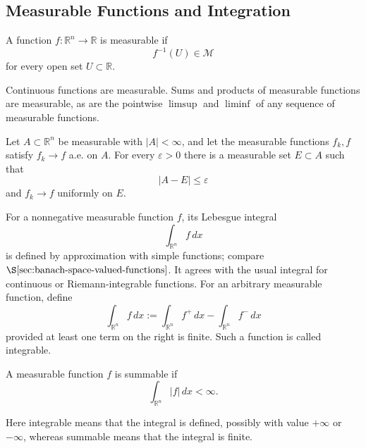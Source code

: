 \subsection{Measurable Functions and Integration}
\label{sec:measurable-functions-integration}

\begin{definition}
\label{def:measurable-function}

A function $f:\mathbb R^n\to\mathbb R$ is measurable if
\[
f^{-1}(U)\in\mathcal M
\]
for every open set $U\subset\mathbb R$.
\end{definition}

Continuous functions are measurable. Sums and products of measurable functions
are measurable, as are the pointwise $\limsup$ and $\liminf$ of any sequence of
measurable functions.

\begin{theorem}
\label{thm:egoroffs-theorem}

Let $A\subset\mathbb R^n$ be measurable with $|A|<\infty$, and let the
measurable functions $f_k,f$ satisfy $f_k\to f$ a.e. on $A$. For every
$\varepsilon>0$ there is a measurable set $E\subset A$ such that
\[
|A-E|\leq\varepsilon
\]
and $f_k\to f$ uniformly on $E$.
\end{theorem}

For a nonnegative measurable function $f$, its Lebesgue integral
\[
\int_{\mathbb R^n}f\,dx
\]
is defined by approximation with simple functions; compare
$\S\ref{sec:banach-space-valued-functions}$. It agrees with the usual integral
for continuous or Riemann-integrable functions. For an arbitrary measurable
function, define
\[
\int_{\mathbb R^n}f\,dx
:=\int_{\mathbb R^n}f^+\,dx-\int_{\mathbb R^n}f^-\,dx
\]
provided at least one term on the right is finite. Such a function is called
integrable.

\begin{definition}
\label{def:summable-function}

A measurable function $f$ is summable if
\[
\int_{\mathbb R^n}|f|\,dx<\infty.
\]
\end{definition}

\begin{remark}
\label{rem:integrable-vs-summable-terminology}

Here integrable means that the integral is defined, possibly with value
$+\infty$ or $-\infty$, whereas summable means that the integral is finite.
\end{remark}

